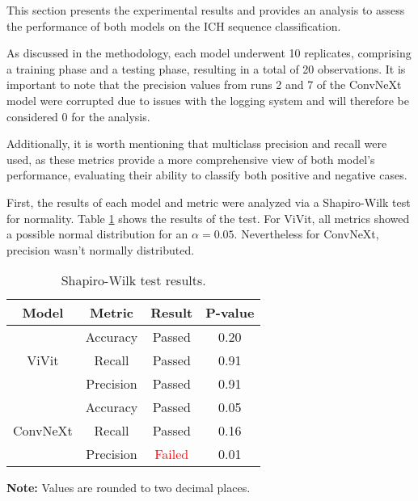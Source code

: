 This section presents the experimental results and provides an analysis to assess the performance of both models on the ICH sequence classification.

As discussed in the methodology, each model underwent 10 replicates, comprising a training phase and a testing phase, resulting in a total of 20 observations. It is important to note that the precision values from runs 2 and 7 of the ConvNeXt model were corrupted due to issues with the logging system and will therefore be considered 0 for the analysis.

Additionally, it is worth mentioning that multiclass precision and recall were used, as these metrics provide a more comprehensive view of both model's performance, evaluating their ability to classify both positive and negative cases.

First, the results of each model and metric were analyzed via a Shapiro-Wilk test for normality. Table \ref{tab:shapiro_results} shows the results of the test. For ViVit, all metrics showed a possible normal distribution for an $\alpha = 0.05$. Nevertheless for ConvNeXt, precision wasn't normally distributed.

\begin{table}[h]
    \centering
    \caption{Shapiro-Wilk test results.}
    \renewcommand{\arraystretch}{1.5}
    \begin{tabular}{|c|c|c|c|}
        \hline
        \textbf{Model} & \textbf{Metric} & \textbf{Result} & \textbf{P-value} \\ \hline
        \multirow{3}{*}{ViVit} & Accuracy & Passed & 0.20 \\ \cline{2-4}
                              & Recall & Passed & 0.91 \\ \cline{2-4}
                              & Precision & Passed & 0.91 \\ \hline
        \multirow{3}{*}{ConvNeXt} & Accuracy & Passed & 0.05 \\ \cline{2-4}
                                  & Recall & Passed & 0.16 \\ \cline{2-4}
                                  & Precision & \textcolor{red}{Failed} & 0.01 \\ \hline
    \end{tabular}
    \begin{center}
        \parbox{\columnwidth}{\centering \footnotesize \textbf{Note:} Values are rounded to two decimal places.}
    \end{center}
\label{tab:shapiro_results}
\end{table}

